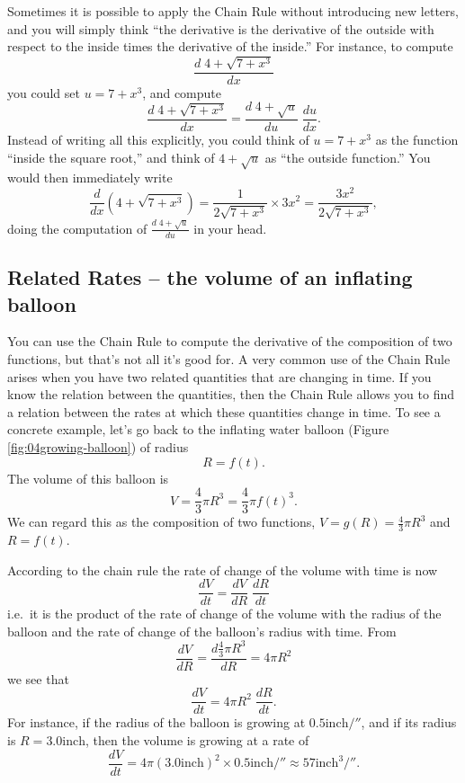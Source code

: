 Sometimes it is possible to apply the Chain Rule without introducing
new letters, and you will simply think ``the derivative is the
derivative of the outside with respect to the inside times the
derivative of the inside.''  For instance, to compute 
\[
\frac{d\;4+\sqrt{7+x^3}}{dx}
\]
you could set $u=7+x^3$, and compute
\[
\frac{d \;4+\sqrt{7+x^3}}{dx} 
=\frac{d\;4+\sqrt u}{du} \; \frac{du}{dx} .
\]
Instead of writing all this explicitly, you could think of $u=7+x^3$
as the function ``inside the square root,'' and think of $4+\sqrt u$
as ``the outside function.'' You would then immediately write
\[
\frac{d}{dx}(4+\sqrt{7+x^3})
= \frac{1}{2\sqrt{7+x^3}}\times 3x^2
=\frac{3x^2}{2\sqrt{7+x^3}},
\]
doing the computation of $\frac{d\;4+\surd u} {du}$ in your head.


\subsection{Related Rates -- the volume of an inflating balloon}
You can use the Chain Rule to compute the derivative of the composition of two
functions, but that's not all it's good for.  A very common use of the Chain
Rule arises when you have two related quantities that are changing in time.  If
you know the relation between the quantities, then the Chain Rule allows you to
find a relation between the rates at which these quantities change in time.  To
see a concrete example, let's go back to the inflating water balloon (Figure
\ref{fig:04growing-balloon}) of radius
\[
R=f(t).
\]
The volume of this balloon is
\[
V=\frac43\pi R^3 = \frac43\pi f(t)^3.
\]
We can regard this as the composition of two functions,  $V=g(R) = \frac43\pi
R^3$ and $R= f(t)$.

According to the chain rule the rate of change of the volume with time is now
\[
\frac{dV}{dt} = \frac{dV}{dR}\;\frac{dR}{dt}
\]
i.e.\ it is the product of the rate of change of the volume with the radius of
the balloon and the rate of change of the balloon's radius with time.  From
\[
\frac{dV}{dR} = \frac{d\frac43\pi R^3}{dR} = 4\pi R^2 
\]
we see that
\[
\frac{dV}{dt} =  4\pi R^2 \;\frac{dR}{dt}.
\]
For instance, if the radius of the balloon is growing at
$0.5\mathrm{inch}/\second$, and if its radius is $R=3.0\mathrm{inch}$,
then the volume is growing at a rate of
\[
\frac{dV}{dt} = 4\pi(3.0\mathrm{inch})^2\times0.5\mathrm{inch}/\second
\approx 57 \mathrm{inch}^3/\second.
\]


